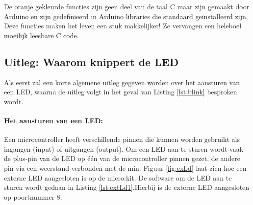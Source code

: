 De \textcolor{BurntOrange}{oranje gekleurde functies} zijn geen deel van de taal C maar zijn gemaakt door Arduino en zijn gedefinieerd in Arduino libraries die standaard geïnstalleerd zijn. Deze functies maken het leven een stuk makkelijker! Ze vervangen een heleboel moeilijk leesbare C code.

\subsection{Uitleg: Waarom knippert de LED}

Als eerst zal een korte algemene uitleg gegeven worden over het aansturen van een LED, waarna de uitleg volgt in het geval van Listing \ref{lst:blink} besproken wordt.
\paragraph{Het aansturen van een LED:}
Een microcontroller heeft verschillende pinnen die kunnen worden gebruikt als ingangen (input) of uitgangen (output). 
Om een LED aan te sturen wordt vaak de plus-pin van de LED op één van de microcontroller pinnen gezet, de andere pin via een weerstand verbonden met de min. Figuur \ref{fig:exLd} laat zien hoe een externe LED aangesloten is op de micro:kit. De software om de LED  aan te sturen wordt gedaan in Listing \ref{lst:extLd1}.Hierbij is de externe LED aangesloten op poortnummer 8.
